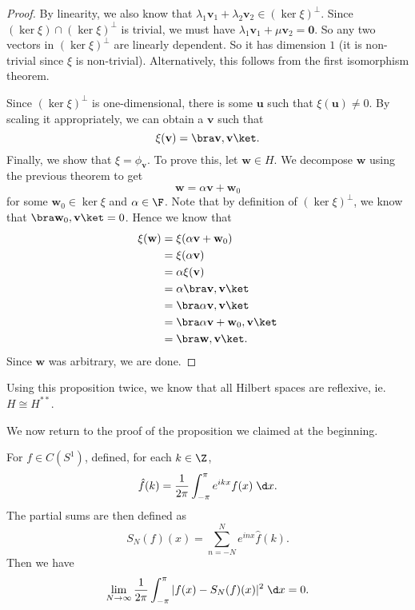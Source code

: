 \documentclass[a4paper]{article}
\begin{document}
\begin{proof}
  By linearity, we also know that $\lambda_1 \mathbf{v}_1 + \lambda_2 \mathbf{v}_2 \in (\ker \xi)^\perp$. Since $(\ker \xi) \cap (\ker \xi)^\perp$ is trivial, we must have $\lambda_1 \mathbf{v}_1 + \mu \mathbf{v}_2 = \mathbf{0}$. So any two vectors in $(\ker \xi)^\perp$ are linearly dependent. So it has dimension $1$ (it is non-trivial since $\xi$ is non-trivial). Alternatively, this follows from the first isomorphism theorem.

  Since $(\ker \xi)^{\perp}$ is one-dimensional, there is some $\mathbf{u}$ such that $\xi(\mathbf{u}) \not= 0$. By scaling it appropriately, we can obtain a $\mathbf{v}$ such that
  \[
    \xi(\mathbf{v}) = \bra \mathbf{v}, \mathbf{v}\ket.
  \]
  Finally, we show that $\xi = \phi_\mathbf{v}$. To prove this, let $\mathbf{w} \in H$. We decompose $\mathbf{w}$ using the previous theorem to get
  \[
    \mathbf{w} = \alpha \mathbf{v} + \mathbf{w}_0
  \]
  for some $\mathbf{w}_0 \in \ker \xi$ and $\alpha \in \F$. Note that by definition of $(\ker \xi)^\perp$, we know that $\bra \mathbf{w}_0, \mathbf{v}\ket = 0$. Hence we know that
  \begin{align*}
    \xi(\mathbf{w}) &= \xi(\alpha \mathbf{v} + \mathbf{w}_0)\\
    &= \xi(\alpha \mathbf{v})\\
    &= \alpha \xi (\mathbf{v})\\
    &= \alpha \bra \mathbf{v}, \mathbf{v}\ket\\
    &= \bra \alpha \mathbf{v}, \mathbf{v}\ket\\
    &= \bra \alpha \mathbf{v} + \mathbf{w}_0, \mathbf{v}\ket\\
    &= \bra \mathbf{w}, \mathbf{v}\ket.
  \end{align*}
  Since $\mathbf{w}$ was arbitrary, we are done.
\end{proof}

Using this proposition twice, we know that all Hilbert spaces are reflexive, ie. $H \cong H^{**}$.

We now return to the proof of the proposition we claimed at the beginning.
\begin{prop}
  For $f \in C(S^1)$, defined, for each $k \in \Z$,
  \[
    \hat{f}(k) = \frac{1}{2\pi} \int_{-\pi}^\pi e^{ikx}f(x)\;\d x.
  \]
  The partial sums are then defined as
  \[
    S_N(f)(x) = \sum_{n = -N}^N e^{inx} \hat{f}(k).
  \]
  Then we have
  \[
    \lim_{N \to \infty} \frac{1}{2\pi}\int_{-\pi}^\pi |f(x) - S_N(f)(x)|^2 \;\d x = 0.
  \]
\end{prop}
\end{document}
